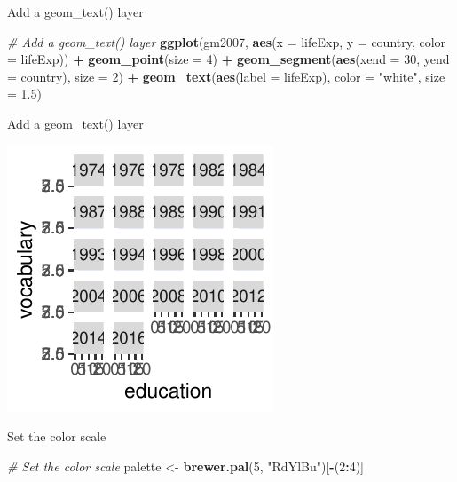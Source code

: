 \documentclass[
  ignorenonframetext,
]{beamer}
\newenvironment{Shaded}{\begin{snugshade}}{\end{snugshade}}
\newcommand{\AttributeTok}[1]{\textcolor[rgb]{0.13,0.29,0.53}{#1}}
\newcommand{\CommentTok}[1]{\textcolor[rgb]{0.56,0.35,0.01}{\textit{#1}}}
\newcommand{\DecValTok}[1]{\textcolor[rgb]{0.00,0.00,0.81}{#1}}
\newcommand{\FloatTok}[1]{\textcolor[rgb]{0.00,0.00,0.81}{#1}}
\newcommand{\FunctionTok}[1]{\textcolor[rgb]{0.13,0.29,0.53}{\textbf{#1}}}
\newcommand{\NormalTok}[1]{#1}
\newcommand{\OtherTok}[1]{\textcolor[rgb]{0.56,0.35,0.01}{#1}}
\newcommand{\SpecialCharTok}[1]{\textcolor[rgb]{0.81,0.36,0.00}{\textbf{#1}}}
\newcommand{\StringTok}[1]{\textcolor[rgb]{0.31,0.60,0.02}{#1}}
\begin{document}
\begin{frame}[fragile]{Add a geom\_text() layer}
\label{add-a-geom_text-layer}

\begin{Shaded}
\begin{Highlighting}[]
\CommentTok{\# Add a geom\_text() layer}
\FunctionTok{ggplot}\NormalTok{(gm2007, }\FunctionTok{aes}\NormalTok{(}\AttributeTok{x =}\NormalTok{ lifeExp, }\AttributeTok{y =}\NormalTok{ country, }\AttributeTok{color =}\NormalTok{ lifeExp)) }\SpecialCharTok{+}
    \FunctionTok{geom\_point}\NormalTok{(}\AttributeTok{size =} \DecValTok{4}\NormalTok{) }\SpecialCharTok{+} \FunctionTok{geom\_segment}\NormalTok{(}\FunctionTok{aes}\NormalTok{(}\AttributeTok{xend =} \DecValTok{30}\NormalTok{, }\AttributeTok{yend =}\NormalTok{ country),}
    \AttributeTok{size =} \DecValTok{2}\NormalTok{) }\SpecialCharTok{+} \FunctionTok{geom\_text}\NormalTok{(}\FunctionTok{aes}\NormalTok{(}\AttributeTok{label =}\NormalTok{ lifeExp), }\AttributeTok{color =} \StringTok{"white"}\NormalTok{,}
    \AttributeTok{size =} \FloatTok{1.5}\NormalTok{)}
\end{Highlighting}
\end{Shaded}
\end{frame}

\begin{frame}{Add a geom\_text() layer}
\label{add-a-geom_text-layer-1}

\begin{center}\includegraphics[width=0.5\linewidth]{Figs/unnamed-chunk-96-1} \end{center}
\end{frame}

\begin{frame}[fragile]{Set the color scale}
\label{set-the-color-scale}

\begin{Shaded}
\begin{Highlighting}[]
\CommentTok{\# Set the color scale}
\NormalTok{palette }\OtherTok{\textless{}{-}} \FunctionTok{brewer.pal}\NormalTok{(}\DecValTok{5}\NormalTok{, }\StringTok{"RdYlBu"}\NormalTok{)[}\SpecialCharTok{{-}}\NormalTok{(}\DecValTok{2}\SpecialCharTok{:}\DecValTok{4}\NormalTok{)]}
\end{Highlighting}
\end{Shaded}
\end{frame}
\end{document}
